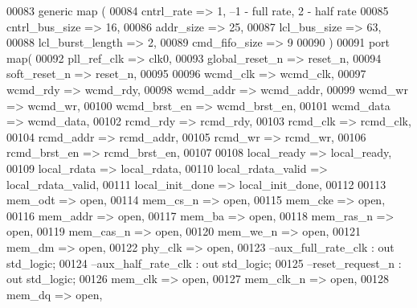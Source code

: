 \begin{DoxyCode}
00083 \textcolor{keywordflow}{generic} \textcolor{keywordflow}{map} (
00084             cntrl_rate          => \textcolor{vhdllogic}{1},\textcolor{keyword}{ --1 - full rate, 2 - half rate}
00085             cntrl_bus_size      => \textcolor{vhdllogic}{16},
00086             addr_size           => \textcolor{vhdllogic}{25},
00087             lcl_bus_size        => \textcolor{vhdllogic}{63},
00088             lcl_burst_length    => \textcolor{vhdllogic}{2},
00089             cmd_fifo_size       => \textcolor{vhdllogic}{9}
00090 \textcolor{vhdlchar}{)}
00091 \textcolor{keywordflow}{port} \textcolor{keywordflow}{map}(
00092       pll_ref_clk       => clk0,
00093       global_reset_n    => reset_n,
00094         soft_reset_n        => reset_n,
00095 
00096         wcmd_clk                => wcmd_clk,
00097         wcmd_rdy                => wcmd_rdy,
00098         wcmd_addr           => wcmd_addr,
00099         wcmd_wr             => wcmd_wr,
00100         wcmd_brst_en        => wcmd_brst_en, 
00101         wcmd_data           => wcmd_data,
00102         rcmd_rdy                => rcmd_rdy,
00103         rcmd_clk                => rcmd_clk,
00104         rcmd_addr           => rcmd_addr,
00105         rcmd_wr             => rcmd_wr,
00106         rcmd_brst_en        => rcmd_brst_en,
00107 
00108         local_ready         => local_ready,
00109         local_rdata         => local_rdata,
00110         local_rdata_valid   => local_rdata_valid,
00111         local_init_done => local_init_done,
00112 
00113         mem_odt             => \textcolor{keywordflow}{open},
00114         mem_cs_n                => \textcolor{keywordflow}{open},
00115         mem_cke             => \textcolor{keywordflow}{open},
00116         mem_addr                => \textcolor{keywordflow}{open},
00117         mem_ba              => \textcolor{keywordflow}{open},
00118         mem_ras_n           => \textcolor{keywordflow}{open},
00119         mem_cas_n           => \textcolor{keywordflow}{open},
00120         mem_we_n                => \textcolor{keywordflow}{open},
00121         mem_dm              => \textcolor{keywordflow}{open},
00122         phy_clk             => \textcolor{keywordflow}{open},
00123 \textcolor{keyword}{        --aux\_full\_rate\_clk : out std\_logic;}
00124 \textcolor{keyword}{        --aux\_half\_rate\_clk : out std\_logic;}
00125 \textcolor{keyword}{        --reset\_request\_n   : out std\_logic;}
00126         mem_clk             => \textcolor{keywordflow}{open},
00127         mem_clk_n           => \textcolor{keywordflow}{open},
00128         mem_dq              => \textcolor{keywordflow}{open},

\end{DoxyCode}
